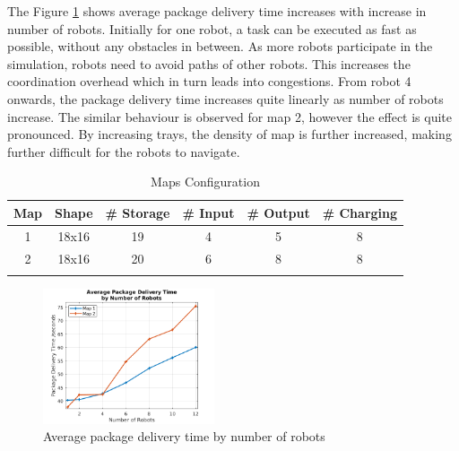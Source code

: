 \documentclass[journal]{IEEEtran}
\begin{document}
The Figure \ref{fig:delivery_time} shows average package delivery time increases with increase in number of robots.  Initially for one robot, a task can be executed as fast as possible, without any obstacles in between. As more robots participate in the simulation, robots need to avoid paths of other robots. This increases the coordination overhead which in turn leads into congestions. From robot 4 onwards, the package delivery time increases quite linearly as number of robots increase. The similar behaviour is observed for map 2, however the effect is quite pronounced. By increasing trays, the density of map is further increased, making further difficult for the robots to navigate. 
%

\begin{table}[h]
\caption{Maps Configuration}
\centering
\begin{tabular}{cccccc}
\hline
Map & Shape & \# Storage & \# Input             & \# Output & \# Charging \\ \hline
1   & 18x16 & 19         & 4                    & 5         & 8           \\
2   & 18x16 & 20         & 6                    & 8         & 8           \\ \hline
    &       &            & \multicolumn{1}{l}{} &           &            
\end{tabular}
\label{tab:maps}
\end{table}


\begin{figure}[h]
	\centering
	\includegraphics[width=0.45\textwidth]{resources/Graphs-paper/graph2.png}
	\caption{Average package delivery time by number of robots }
	\label{fig:delivery_time}
\end{figure}
\end{document}
